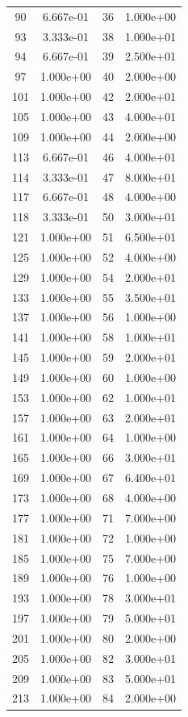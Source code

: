 \documentclass[12pt]{article}
\begin{document}
\begin{longtable}{@{}cccc@{}}
90 & 6.667e-01 & 36 & 1.000e+00 \\
93 & 3.333e-01 & 38 & 1.000e+01 \\
94 & 6.667e-01 & 39 & 2.500e+01 \\
97 & 1.000e+00 & 40 & 2.000e+00 \\
101 & 1.000e+00 & 42 & 2.000e+01 \\
105 & 1.000e+00 & 43 & 4.000e+01 \\
109 & 1.000e+00 & 44 & 2.000e+00 \\
113 & 6.667e-01 & 46 & 4.000e+01 \\
114 & 3.333e-01 & 47 & 8.000e+01 \\
117 & 6.667e-01 & 48 & 4.000e+00 \\
118 & 3.333e-01 & 50 & 3.000e+01 \\
121 & 1.000e+00 & 51 & 6.500e+01 \\
125 & 1.000e+00 & 52 & 4.000e+00 \\
129 & 1.000e+00 & 54 & 2.000e+01 \\
133 & 1.000e+00 & 55 & 3.500e+01 \\
137 & 1.000e+00 & 56 & 1.000e+00 \\
141 & 1.000e+00 & 58 & 1.000e+01 \\
145 & 1.000e+00 & 59 & 2.000e+01 \\
149 & 1.000e+00 & 60 & 1.000e+00 \\
153 & 1.000e+00 & 62 & 1.000e+01 \\
157 & 1.000e+00 & 63 & 2.000e+01 \\
161 & 1.000e+00 & 64 & 1.000e+00 \\
165 & 1.000e+00 & 66 & 3.000e+01 \\
169 & 1.000e+00 & 67 & 6.400e+01 \\
173 & 1.000e+00 & 68 & 4.000e+00 \\
177 & 1.000e+00 & 71 & 7.000e+00 \\
181 & 1.000e+00 & 72 & 1.000e+00 \\
185 & 1.000e+00 & 75 & 7.000e+00 \\
189 & 1.000e+00 & 76 & 1.000e+00 \\
193 & 1.000e+00 & 78 & 3.000e+01 \\
197 & 1.000e+00 & 79 & 5.000e+01 \\
201 & 1.000e+00 & 80 & 2.000e+00 \\
205 & 1.000e+00 & 82 & 3.000e+01 \\
209 & 1.000e+00 & 83 & 5.000e+01 \\
213 & 1.000e+00 & 84 & 2.000e+00 \\

\end{longtable}
\end{document}
